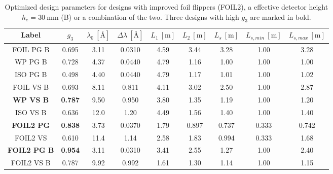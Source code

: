 \begin{table}[h!]
	\centering
	\begin{tabular}{c | c | c c c c c | c c}
		\toprule
		Label & $g_3$ & $\lambda_0 ~[\unit{\angstrom}]$ & $\Delta\lambda ~[\unit{\angstrom}]$ & $L_1 ~[\unit{\meter}]$ & $L_2 ~[\unit{\meter}]$ & $L_s  ~[\unit{\meter}]$ & $L_{s,min}  ~[\unit{\meter}]$& $L_{s, max}  ~[\unit{\meter}]$\\
		\midrule
		FOIL PG B & \num{0.695} & \num{3.11} & \num{0.0310} & \num{4.59} & \num{3.44} & \num{3.28} & \num{1.00} & \num{3.28} \\
		WP PG B & \num{0.728} & \num{4.37} & \num{0.0440} & \num{4.79} & \num{1.16} & \num{1.00} & \num{1.00} & \num{1.00} \\
		ISO PG B & \num{0.498} & \num{4.40} & \num{0.0440} & \num{4.79} & \num{1.17} & \num{1.01} & \num{1.00} & \num{1.02} \\
		FOIL VS B & \num{0.693} & \num{8.11} & \num{0.811} & \num{4.11} & \num{3.02} & \num{2.50} & \num{1.00} & \num{2.87} \\
		\textbf{WP VS B} & \textbf{0.787} & \num{9.50} & \num{0.950} & \num{3.80} & \num{1.35} & \num{1.19} & \num{1.00} & \num{1.20} \\
		ISO VS B & \num{0.636} & \num{12.0} & \num{1.20} & \num{4.49} & \num{1.56} & \num{1.40} & \num{1.00} & \num{1.40} \\
		\midrule
		\textbf{FOIL2 PG} & \textbf{0.838} & \num{3.73} & \num{0.0370} & \num{1.79} & \num{0.897} & \num{0.737} & \num{0.333} & \num{0.742} \\
		FOIL2 VS & \num{0.610} & \num{11.4} & \num{1.14} & \num{2.58} & \num{1.83} & \num{0.994} & \num{0.333} & \num{1.68} \\
		\textbf{FOIL2 PG B} & \textbf{0.954} & \num{3.11} & \num{0.0310} & \num{3.41} & \num{2.55} & \num{1.27} & \num{1.00} & \num{2.40} \\
		FOIL2 VS B & \num{0.787} & \num{9.92} & \num{0.992} & \num{1.61} & \num{1.30} & \num{1.14} & \num{1.00} & \num{1.15} \\
		\bottomrule
	\end{tabular}
	\caption{Optimized design parameters for designs with improved foil flippers (FOIL2), a effective detector height $h_e = \SI{30}{\milli\meter}$ (B) or a combination of the two. Three designs with high $g_3$ are marked in bold.}
	\label{tab:optimized-designs-boost}
\end{table}

